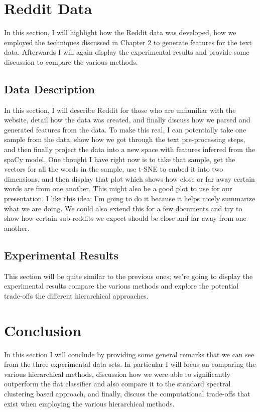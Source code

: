 \documentclass[../thesis.tex]{subfiles}
\begin{document}
\section{Reddit Data}
In this section, I will highlight how the Reddit data was developed, how we
employed the techniques discussed in Chapter 2 to generate features for the text
data. Afterwards I will again display the experimental results and provide some
discussion to compare the various methods.

\subsection{Data Description}
In this section, I will describe Reddit for those who are unfamiliar with the
website, detail how the data was created, and finally discuss how we parsed and
generated features from the data. To make this real, I can potentially take one
sample from the data, show how we got through the text pre-processing steps, and
then finally project the data into a new space with features inferred from the
spaCy model. One thought I have right now is to take that sample, get the
vectors for all the words in the sample, use t-SNE to embed it into two
dimensions, and then display that plot which shows how close or far away certain
words are from one another. This might also be a good plot to use for our
presentation. I like this idea; I'm going to do it because it helps nicely
summarize what we are doing. We could also extend this for a few documents and
try to show how certain sub-reddits we expect should be close and far away from
one another.

\subsection{Experimental Results}
This section will be quite similar to the previous ones; we're going to display
the experimental results compare the various methods and explore the potential
trade-offs the different hierarchical approaches.

\section{Conclusion}
In this section I will conclude by providing some general remarks that we can
see from the three experimental data sets. In particular I will focus on
comparing the various hierarchical methods, discussion how we were able to
significantly outperform the flat classifier and also compare it to the standard
spectral clustering based approach, and finally, discuss the computational
trade-offs that exist when employing the various hierarchical methods.
\end{document}
